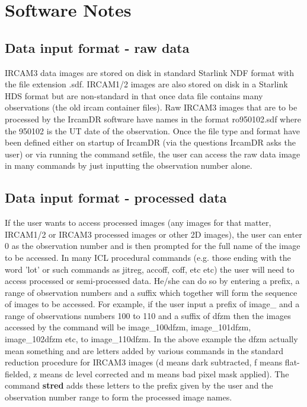 \section{Software Notes}

\subsection{Data input format - raw data}

{\sc IRCAM3} data images are stored on disk in standard Starlink NDF format
with the file extension .sdf.  {\sc IRCAM1/2} images are also stored on disk in
a Starlink HDS format but are non-standard in that once data file
contains many observations (the old ircam container files). Raw {\sc IRCAM3}
images that are to be processed by the {\sc IrcamDR} software have
names in the format ro950102.sdf where the 950102 is the UT date of the
observation. Once the file type and format have been defined either on
startup of {\sc IrcamDR} (via the questions {\sc IrcamDR} asks the user) or via
running the command setfile, the user can access the raw data image in
many commands by just inputting the observation number alone.

\subsection{Data input format - processed data}

If the user wants to access processed images (any images for that matter,
{\sc IRCAM1/2} or {\sc IRCAM3} processed images or other 2D images), the user can
enter 0 as the observation number and is then prompted for the full name
of the image to be accessed.  In many ICL procedural commands (e.g. those
ending with the word 'lot' or such commands as jitreg, accoff, coff, etc
etc) the user will need to access processed or semi-processed data.
He/she can do so by entering a prefix, a range of observation numbers and
a suffix which together will form the sequence of images to be accessed.
For example, if the user input a prefix of image\_ and a range of
observations numbers 100 to 110 and a suffix of dfzm then the images
accessed by the command will be image\_100dfzm, image\_101dfzm, image\_102dfzm
etc, to image\_110dfzm. In the above example the dfzm actually mean
something and are letters added by various commands in the standard
reduction procedure for {\sc IRCAM3} images (d means dark subtracted, f means
flat-fielded, z means dc level corrected and m means bad pixel mask
applied).  The command {\bf stred} adds these letters to the prefix given by
the user and the observation number range to form the processed image
names.

